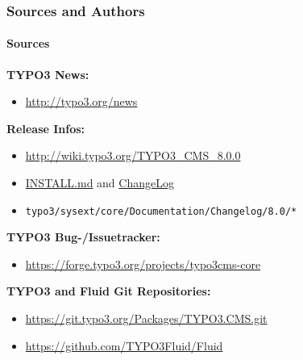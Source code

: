 \begin{frame}[fragile]
	\frametitle{Sources and Authors}
	\framesubtitle{Sources}

	\textbf{TYPO3 News:}
		\begin{itemize}\smaller
			\item \url{http://typo3.org/news}
		\end{itemize}

	\textbf{Release Infos:}
		\begin{itemize}\smaller
			\item \url{http://wiki.typo3.org/TYPO3_CMS_8.0.0}
			\item \href{https://github.com/TYPO3/TYPO3.CMS/blob/master/INSTALL.md}{INSTALL.md} and \href{https://github.com/TYPO3/TYPO3.CMS/tree/master/typo3/sysext/core/Documentation/Changelog}{ChangeLog}
			\item \texttt{typo3/sysext/core/Documentation/Changelog/8.0/*}
		\end{itemize}

	\textbf{TYPO3 Bug-/Issuetracker:}
		\begin{itemize}\smaller
			\item \url{https://forge.typo3.org/projects/typo3cms-core}
		\end{itemize}

	\textbf{TYPO3 and Fluid Git Repositories:}
		\begin{itemize}\smaller
			\item \url{https://git.typo3.org/Packages/TYPO3.CMS.git}
			\item \url{https://github.com/TYPO3Fluid/Fluid}
		\end{itemize}

\end{frame}


